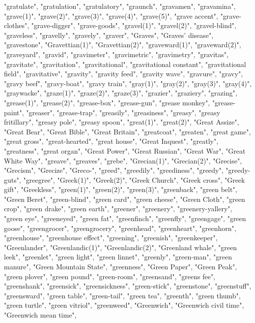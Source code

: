 "gratulate",
"gratulation",
"gratulatory",
"graunch",
"gravamen",
"gravamina",
"grave(1)",
"grave(2)",
"grave(3)",
"grave(4)",
"grave(5)",
"grave accent",
"grave-clothes",
"grave-digger",
"grave-goods",
"gravel(1)",
"gravel(2)",
"gravel-blind",
"graveless",
"gravelly",
"gravely",
"graver",
"Graves",
"Graves' disease",
"gravestone",
"Gravettian(1)",
"Gravettian(2)",
"graveward(1)",
"graveward(2)",
"graveyard",
"gravid",
"gravimeter",
"gravimetric",
"gravimetry",
"gravitas",
"gravitate",
"gravitation",
"gravitational",
"gravitational constant",
"gravitational field",
"gravitative",
"gravity",
"gravity feed",
"gravity wave",
"gravure",
"gravy",
"gravy beef",
"gravy-boat",
"gravy train",
"gray(1)",
"gray(2)",
"gray(3)",
"gray(4)",
"graywacke",
"graze(1)",
"graze(2)",
"graze(3)",
"grazier",
"graziery",
"grazing",
"grease(1)",
"grease(2)",
"grease-box",
"grease-gun",
"grease monkey",
"grease-paint",
"greaser",
"grease-trap",
"greasily",
"greasiness",
"greasy",
"greasy fritillary",
"greasy pole",
"greasy spoon",
"great(1)",
"great(2)",
"Great Assize",
"Great Bear",
"Great Bible",
"Great Britain",
"greatcoat",
"greaten",
"great game",
"great gross",
"great-hearted",
"great house",
"Great Inquest",
"greatly",
"greatness",
"great organ",
"Great Power",
"Great Russian",
"Great War",
"Great White Way",
"greave",
"greaves",
"grebe",
"Grecian(1)",
"Grecian(2)",
"Grecise",
"Grecism",
"Grecize",
"Greco-",
"greed",
"greedily",
"greediness",
"greedy",
"greedy-guts",
"greegree",
"Greek(1)",
"Greek(2)",
"Greek Church",
"Greek cross",
"Greek gift",
"Greekless",
"green(1)",
"green(2)",
"green(3)",
"greenback",
"green belt",
"Green Beret",
"green-blind",
"green card",
"green cheese",
"Green Cloth",
"green crop",
"green drake",
"green earth",
"greener",
"greenery",
"greenery-yallery",
"green eye",
"greeneyed",
"green fat",
"greenfinch",
"greenfly",
"greengage",
"green goose",
"greengrocer",
"greengrocery",
"greenhead",
"greenheart",
"greenhorn",
"greenhouse",
"greenhouse effect",
"greening",
"greenish",
"greenkeeper",
"Greenlander",
"Greenlandic(1)",
"Greenlandic(2)",
"Greenland whale",
"green leek",
"greenlet",
"green light",
"green linnet",
"greenly",
"green-man",
"green manure",
"Green Mountain State",
"greenness",
"Green Paper",
"Green Peak",
"green plover",
"green pound",
"green-room",
"greensand",
"greens fee",
"greenshank",
"greensick",
"greensickness",
"green-stick",
"greenstone",
"greenstuff",
"greensward",
"green table",
"green-tail",
"green tea",
"greenth",
"green thumb",
"green turtle",
"green vitriol",
"greenweed",
"Greenwich",
"Greenwich civil time",
"Greenwich mean time",
